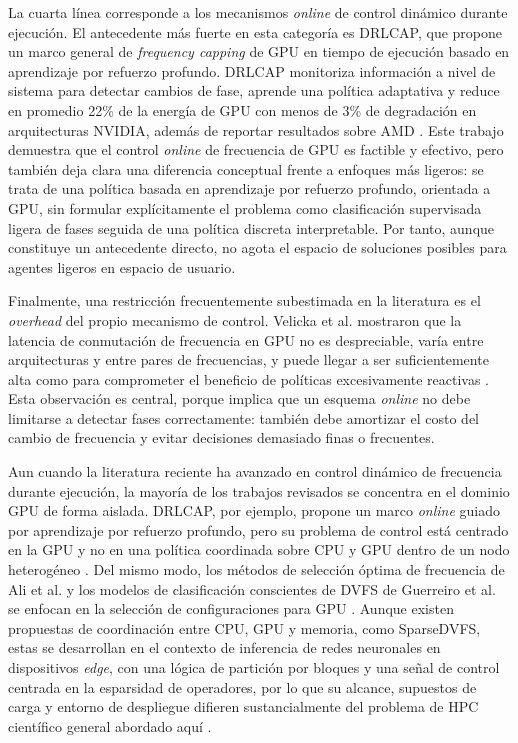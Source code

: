 \documentclass[12pt,oneside,spanish]{book}
\begin{document}
La cuarta línea corresponde a los mecanismos \textit{online} de control dinámico durante ejecución. El antecedente más fuerte en esta categoría es DRLCAP, que propone un marco general de \textit{frequency capping} de GPU en tiempo de ejecución basado en aprendizaje por refuerzo profundo. DRLCAP monitoriza información a nivel de sistema para detectar cambios de fase, aprende una política adaptativa y reduce en promedio 22\% de la energía de GPU con menos de 3\% de degradación en arquitecturas NVIDIA, además de reportar resultados sobre AMD \cite{Wang2024}. Este trabajo demuestra que el control \textit{online} de frecuencia de GPU es factible y efectivo, pero también deja clara una diferencia conceptual frente a enfoques más ligeros: se trata de una política basada en aprendizaje por refuerzo profundo, orientada a GPU, sin formular explícitamente el problema como clasificación supervisada ligera de fases seguida de una política discreta interpretable. Por tanto, aunque constituye un antecedente directo, no agota el espacio de soluciones posibles para agentes ligeros en espacio de usuario.

Finalmente, una restricción frecuentemente subestimada en la literatura es el \textit{overhead} del propio mecanismo de control. Velicka et al. mostraron que la latencia de conmutación de frecuencia en GPU no es despreciable, varía entre arquitecturas y entre pares de frecuencias, y puede llegar a ser suficientemente alta como para comprometer el beneficio de políticas excesivamente reactivas \cite{Velicka2025}. Esta observación es central, porque implica que un esquema \textit{online} no debe limitarse a detectar fases correctamente: también debe amortizar el costo del cambio de frecuencia y evitar decisiones demasiado finas o frecuentes.

Aun cuando la literatura reciente ha avanzado en control dinámico de frecuencia durante ejecución, la mayoría de los trabajos revisados se concentra en el dominio GPU de forma aislada. DRLCAP, por ejemplo, propone un marco \textit{online} guiado por aprendizaje por refuerzo profundo, pero su problema de control está centrado en la GPU y no en una política coordinada sobre CPU y GPU dentro de un nodo heterogéneo \cite{Wang2024}. Del mismo modo, los métodos de selección óptima de frecuencia de Ali et al. y los modelos de clasificación conscientes de DVFS de Guerreiro et al. se enfocan en la selección de configuraciones para GPU \cite{Ali2023,Guerreiro2019}. Aunque existen propuestas de coordinación entre CPU, GPU y memoria, como SparseDVFS, estas se desarrollan en el contexto de inferencia de redes neuronales en dispositivos \textit{edge}, con una lógica de partición por bloques y una señal de control centrada en la esparsidad de operadores, por lo que su alcance, supuestos de carga y entorno de despliegue difieren sustancialmente del problema de HPC científico general abordado aquí \cite{Zhang2026}.
\end{document}
